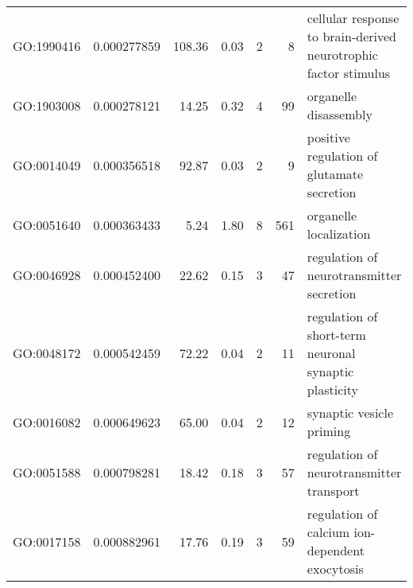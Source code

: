 \documentclass[letterpaper,12pt]{article}
\numberwithin{equation}{appendix}
\begin{document}
\begin{landscape}
{{\begin{longtable}{lrrrrrl}
  GO:1990416 & 0.000277859 & 108.36 & 0.03 & 2 & 8 & cellular response to brain-derived neurotrophic factor stimulus \\ 
  GO:1903008 & 0.000278121 & 14.25 & 0.32 & 4 & 99 & organelle disassembly \\ 
  GO:0014049 & 0.000356518 & 92.87 & 0.03 & 2 & 9 & positive regulation of glutamate secretion \\ 
  GO:0051640 & 0.000363433 & 5.24 & 1.80 & 8 & 561 & organelle localization \\ 
  GO:0046928 & 0.000452400 & 22.62 & 0.15 & 3 & 47 & regulation of neurotransmitter secretion \\ 
  GO:0048172 & 0.000542459 & 72.22 & 0.04 & 2 & 11 & regulation of short-term neuronal synaptic plasticity \\ 
  GO:0016082 & 0.000649623 & 65.00 & 0.04 & 2 & 12 & synaptic vesicle priming \\ 
  GO:0051588 & 0.000798281 & 18.42 & 0.18 & 3 & 57 & regulation of neurotransmitter transport \\ 
  GO:0017158 & 0.000882961 & 17.76 & 0.19 & 3 & 59 & regulation of calcium ion-dependent exocytosis \\ 
   \bottomrule
\end{longtable}

}}
\end{landscape}
\end{document}
